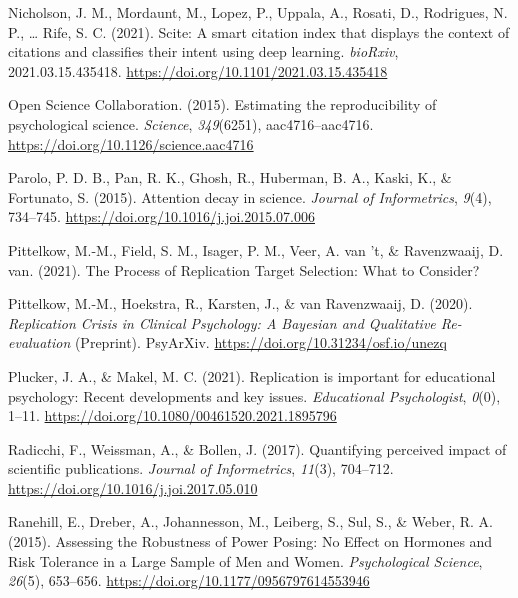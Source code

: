 \documentclass[
  english,
  man,floatsintext]{apa6}
\newlength{\cslhangindent}
\newlength{\cslentryspacingunit} %
\newenvironment{CSLReferences}[2] %
 {%
  \setlength{\parindent}{0pt}
  \ifodd #1
  \let\oldpar\par
  \def\par{\hangindent=\cslhangindent\oldpar}
  \fi
  \setlength{\parskip}{#2\cslentryspacingunit}
 }%
 {}
\begin{document}
\begin{CSLReferences}{1}{0}
\leavevmode{}%
Nicholson, J. M., Mordaunt, M., Lopez, P., Uppala, A., Rosati, D., Rodrigues, N. P., \ldots{} Rife, S. C. (2021). Scite: A smart citation index that displays the context of citations and classifies their intent using deep learning. \emph{bioRxiv}, 2021.03.15.435418. \url{https://doi.org/10.1101/2021.03.15.435418}

\leavevmode{}%
Open Science Collaboration. (2015). Estimating the reproducibility of psychological science. \emph{Science}, \emph{349}(6251), aac4716--aac4716. \url{https://doi.org/10.1126/science.aac4716}

\leavevmode{}%
Parolo, P. D. B., Pan, R. K., Ghosh, R., Huberman, B. A., Kaski, K., \& Fortunato, S. (2015). Attention decay in science. \emph{Journal of Informetrics}, \emph{9}(4), 734--745. \url{https://doi.org/10.1016/j.joi.2015.07.006}

\leavevmode{}%
Pittelkow, M.-M., Field, S. M., Isager, P. M., Veer, A. van 't, \& Ravenzwaaij, D. van. (2021). The {Process} of {Replication Target Selection}: {What} to {Consider}?

\leavevmode{}%
Pittelkow, M.-M., Hoekstra, R., Karsten, J., \& van Ravenzwaaij, D. (2020). \emph{Replication {Crisis} in {Clinical Psychology}: {A Bayesian} and {Qualitative Re}-evaluation} (Preprint). {PsyArXiv}. \url{https://doi.org/10.31234/osf.io/unezq}

\leavevmode{}%
Plucker, J. A., \& Makel, M. C. (2021). Replication is important for educational psychology: {Recent} developments and key issues. \emph{Educational Psychologist}, \emph{0}(0), 1--11. \url{https://doi.org/10.1080/00461520.2021.1895796}

\leavevmode{}%
Radicchi, F., Weissman, A., \& Bollen, J. (2017). Quantifying perceived impact of scientific publications. \emph{Journal of Informetrics}, \emph{11}(3), 704--712. \url{https://doi.org/10.1016/j.joi.2017.05.010}

\leavevmode{}%
Ranehill, E., Dreber, A., Johannesson, M., Leiberg, S., Sul, S., \& Weber, R. A. (2015). Assessing the {Robustness} of {Power Posing}: {No Effect} on {Hormones} and {Risk Tolerance} in a {Large Sample} of {Men} and {Women}. \emph{Psychological Science}, \emph{26}(5), 653--656. \url{https://doi.org/10.1177/0956797614553946}


\end{CSLReferences}
\end{document}
